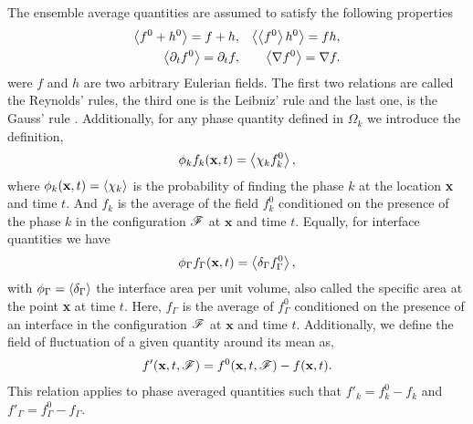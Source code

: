 The ensemble average quantities are assumed to satisfy the following properties \citep{drew1983mathematical}
\begin{align}
    \avg{f^0+h^0} = f+h, 
    && \avg{\avg{f^0}h^0} = fh, \nonumber\\
    \avg{\pddt f^0} 
    = \pddt f,  
    &&\avg{\grad f^0}
    = \grad f. 
    \label{eq:avg_properties}
\end{align}
were $f$ and $h$ are two arbitrary Eulerian fields. 
The first two relations are called the Reynolds' rules, the third one is the Leibniz' rule and the last one, is the Gauss' rule \citep{drew1983mathematical}.
Additionally, for any phase quantity defined in $\Omega_k$ we introduce the definition, 
\begin{equation}
    \phi_k f_k (\textbf{x},t) = \avg{\chi_k f_k^0},
    \label{eq:1_avg}
\end{equation}
where $\phi_k(\textbf{x},t) = \left<\chi_k\right>$ is the probability of finding the phase $k$ at the location \textbf{x} and time $t$.
And $f_k$ is the average of the field $f_k^0$ conditioned on the presence of the phase $k$ in the configuration $\mathscr{F}$ at $\textbf{x}$ and time $t$.
Equally, for interface quantities we have 
\begin{equation}
    \phi_\Gamma f_\Gamma (\textbf{x},t) = \left<\delta_\Gamma f_\Gamma^0\right>,
\end{equation}
with $\phi_\Gamma = \left<\delta_\Gamma\right>$ the interface area per unit volume, also called the specific area at the point \textbf{x} at time $t$. 
Here, $f_\Gamma$ is the average of $f^0_\Gamma$ conditioned on the presence of an interface in the configuration $\mathscr{F}$ at $\textbf{x}$ and time $t$. 
Additionally, we define the field of fluctuation of a given quantity around its mean as,
\begin{align}
    f'(\textbf{x},t,\FF) = f^0(\textbf{x},t,\FF) - f(\textbf{x},t).
    \label{eq:def_fluctu}
\end{align}
This relation applies to phase averaged quantities such that $f'_k = f^0_k - f_k$ and $f'_\Gamma = f^0_\Gamma - f_\Gamma$. 


